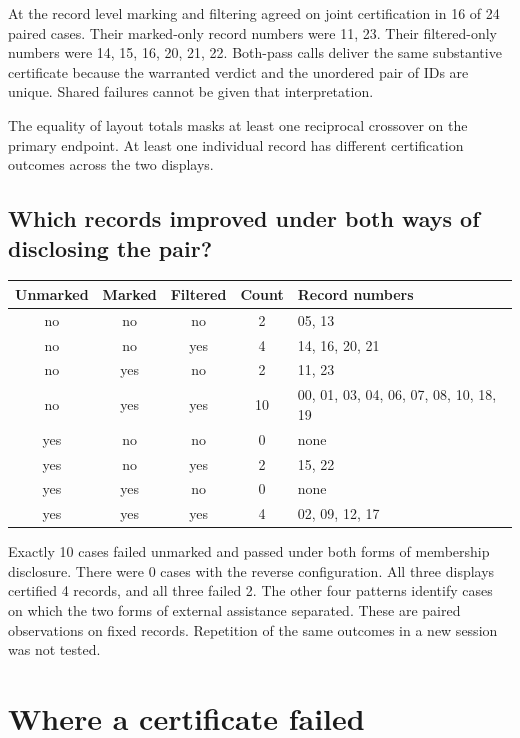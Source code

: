 \documentclass[12pt,letterpaper]{article}
\begin{document}
At the record level marking and filtering agreed on joint certification in 16 of 24 paired cases. Their marked-only record numbers were 11, 23. Their filtered-only numbers were 14, 15, 16, 20, 21, 22. Both-pass calls deliver the same substantive certificate because the warranted verdict and the unordered pair of IDs are unique. Shared failures cannot be given that interpretation.

The equality of layout totals masks at least one reciprocal crossover on the primary endpoint. At least one individual record has different certification outcomes across the two displays.

\subsection{Which records improved under both ways of disclosing the pair?}

\begin{center}{\footnotesize\setlength{\tabcolsep}{4pt}\begin{tabularx}{\linewidth}{@{}ccccY@{}}\toprule
Unmarked & Marked & Filtered & Count & Record numbers\\ \midrule
no & no & no & 2 & 05, 13\\
no & no & yes & 4 & 14, 16, 20, 21\\
no & yes & no & 2 & 11, 23\\
no & yes & yes & 10 & 00, 01, 03, 04, 06, 07, 08, 10, 18, 19\\
yes & no & no & 0 & none\\
yes & no & yes & 2 & 15, 22\\
yes & yes & no & 0 & none\\
yes & yes & yes & 4 & 02, 09, 12, 17\\\bottomrule\end{tabularx}}\end{center}

Exactly 10 cases failed unmarked and passed under both forms of membership disclosure. There were 0 cases with the reverse configuration. All three displays certified 4 records, and all three failed 2. The other four patterns identify cases on which the two forms of external assistance separated. These are paired observations on fixed records. Repetition of the same outcomes in a new session was not tested.

\section{Where a certificate failed}
\end{document}
